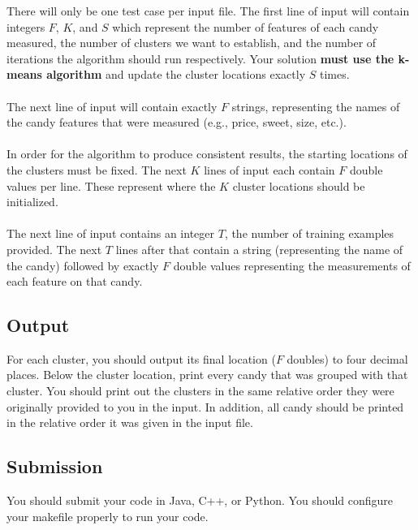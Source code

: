 \documentclass[11pt]{article}
\begin{document}
There will only be one test case per input file. The first line of input will contain integers $F$, $K$, and $S$ which represent the number of features of each candy measured, the number of clusters we want to establish, and the number of iterations the algorithm should run respectively. Your solution \textbf{must use the k-means algorithm} and update the cluster locations exactly $S$ times.\\
\\
The next line of input will contain exactly $F$ strings, representing the names of the candy features that were measured (e.g., price, sweet, size, etc.).\\
\\
In order for the algorithm to produce consistent results, the starting locations of the clusters must be fixed. The next $K$ lines of input each contain $F$ double values per line. These represent where the $K$ cluster locations should be initialized.\\
\\
The next line of input contains an integer $T$, the number of training examples provided. The next $T$ lines after that contain a string (representing the name of the candy) followed by exactly $F$ double values representing the measurements of each feature on that candy.

\subsection*{Output}

For each cluster, you should output its final location ($F$ doubles) to four decimal places. Below the cluster location, print every candy that was grouped with that cluster. You should print out the clusters in the same relative order they were originally provided to you in the input. In addition, all candy should be printed in the relative order it was given in the input file.

\subsection*{Submission}

You should submit your code in Java, C++, or Python. You should configure your makefile properly to run your code.
\end{document}
